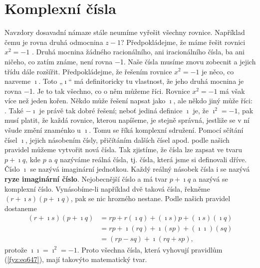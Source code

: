   \section{Komplexní čísla}\label{fyz:IchapXXIIsecV}     
    Navzdory dosavadní námaze stále neumíme vyřešit všechny rovnice. Například čemu je rovna druhá
    odmocnina \(z-1\)? Předpokládejme, že máme řešit rovnici \(x^2 =-1\) . Druhá mocnina žádného
    racionálního, ani iracionálního čísla, ba ani ničeho, co zatím známe, není rovna \num{-1}. Naše
    čísla musíme znovu zobecnit a jejich třídu dále rozšířit. Předpokládejme, že řešením rovnice
    \(x^2 = -1\) je něco, co nazveme \(\imath\). Toto „\(\imath\)“ má deﬁnitoricky tu vlastnost, že
    jeho druhá mocnina je rovna \num{-1}. Je to tak všechno, co o něm můžeme říci. Rovnice \(x^2 =
    -1\) má však více než jeden kořen. Někdo může řešení napsat jako \(\imath\), ale někdo jiný může
    říci: . Také \(-\imath\) je právě tak dobré řešení; neboť jediná deﬁnice \(\imath\) je, že
    \(\imath^2 = -1\), pak musí platit, že každá rovnice, kterou napíšeme, je stejně správná,
    jestliže se v ní všude změní znaménko u \(\imath\). Tomu se říká komplexní sdružení. Pomocí
    sčítání čísel \(\imath\), jejich násobením čísly, přičítáním dalších čísel apod. podle našich
    pravidel můžeme vytvořit nová čísla. Tak zjistíme, že čísla lze zapsat ve tvaru \(p + \imath
    q\), kde \(p\) a \(q\) nazýváme reálná čísla, tj. čísla, která jsme si deﬁnovali dříve. Číslo
    \(\imath\) se nazývá imaginární jednotkou. Každý reálný násobek čísla i se nazývá \textbf{ryze
    imaginární číslo}. Nejobecnější číslo a má tvar \(p + \imath q\) a nazývá se komplexní číslo.
    Vynásobíme-li například dvě taková čísla, řekněme \((r + \imath s)(p + \imath q)\), pak se nic
    hrozného nestane. Podle našich pravidel dostaneme
    \begin{align}\label{fyz:eq697}
      (r+\imath s)(p+\imath q)&=rp+r(\imath q)+(\imath s)p+(\imath s)(\imath q)   \nonumber \\
                              &=rp+\imath(rq)+\imath(sp)+(\imath\imath)(sq)       \nonumber \\
                              &=(rp−sq)+\imath(rq+sp),
    \end{align}
    protože \(\imath\imath = \imath^2 = -1\). Proto všechna čísla, která vyhovují pravidlům
    (\ref{fyz:eq647}), mají takovýto matematický tvar.

